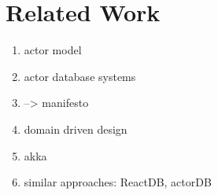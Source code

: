 
\section{Related Work}

\begin{enumerate}
  \item actor model
  \item actor database systems
  \item --> manifesto
  \item domain driven design
  \item akka
  \item similar approaches: ReactDB, actorDB
\end{enumerate}